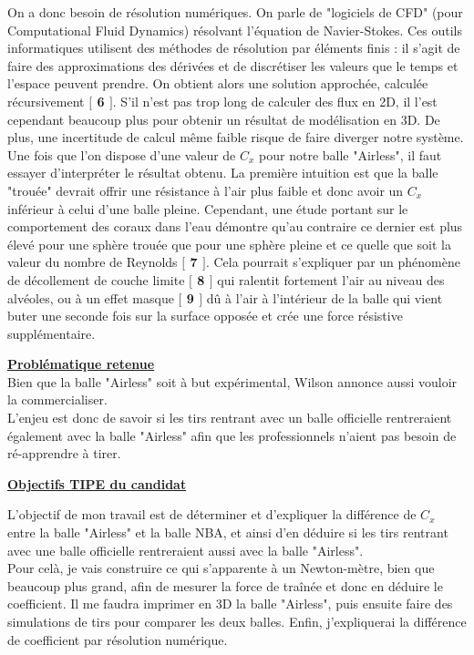 \documentclass{article}
\newcommand{\vtab} {\vspace{0.4cm}}
\newcommand{\mvtab} {\vspace{0.1cm}}
\newcommand{\htab} {\hspace{1cm}}
\begin{document}
\htab On a donc besoin de résolution numériques. On parle de "logiciels de CFD" (pour Computational Fluid Dynamics) résolvant l'équation de Navier-Stokes. Ces outils informatiques utilisent des méthodes de résolution par éléments finis : il s’agit de faire des approximations des dérivées et de discrétiser les valeurs que le temps et l’espace peuvent prendre. On obtient alors une solution approchée, calculée récursivement \textbf{$[$ 6 $]$}. S'il n'est pas trop long de calculer des flux en 2D, il l'est cependant beaucoup plus pour obtenir un résultat de modélisation en 3D. De plus, une incertitude de calcul même faible risque de faire diverger notre système. \\ \mvtab
\htab Une fois que l’on dispose d’une valeur de $C_x$ pour notre balle "Airless", il faut essayer d’interpréter le résultat obtenu. La première intuition est que la balle "trouée" devrait offrir une résistance à l’air plus faible et donc avoir un $C_x$ inférieur à celui d’une balle pleine. Cependant, une étude portant sur le comportement des coraux dans l’eau démontre qu’au contraire ce dernier est plus élevé pour une sphère trouée que pour une sphère pleine et ce quelle que soit la valeur du nombre de Reynolds \textbf{$[$ 7 $]$}. Cela pourrait s’expliquer par un phénomène de décollement de couche limite \textbf{$[$ 8 $]$} qui ralentit fortement l’air au niveau des alvéoles, ou à un effet masque \textbf{$[$ 9 $]$} dû à l’air à l’intérieur de la balle qui vient buter une seconde fois sur la surface opposée et crée une force résistive supplémentaire.

\vspace{0.6cm}

\underline{\Large{\textbf{Problématique retenue}}} \\

\vspace{0.6cm}
Bien que la balle "Airless" soit à but expérimental, Wilson annonce aussi vouloir la commercialiser. \\
\vtab
L'enjeu est donc de savoir si les tirs rentrant avec un balle officielle rentreraient également avec la balle "Airless" afin que les professionnels n'aient pas besoin de ré-apprendre à tirer.
\vspace{0.6cm}

\underline{\Large{\textbf{Objectifs TIPE du candidat}}} \\

\vspace{0.6cm}

L'objectif de mon travail est de déterminer et d'expliquer la différence de $C_x$ entre la balle "Airless" et la balle NBA, et ainsi d'en déduire si les tirs rentrant avec une balle officielle rentreraient aussi avec la balle "Airless". \\
Pour celà, je vais construire ce qui s'apparente à un Newton-mètre, bien que beaucoup plus grand, afin de mesurer la force de traînée et donc en déduire le coefficient. Il me faudra imprimer en 3D la balle "Airless", puis ensuite faire des simulations de tirs pour comparer les deux balles. Enfin, j'expliquerai la différence de coefficient par résolution numérique.
\end{document}
